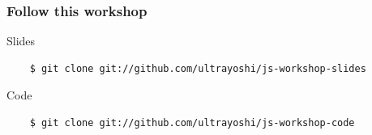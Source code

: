 \begin{frame}[fragile]
  \frametitle{Follow this workshop}

  \begin{block}{Slides}
    {\scriptsize
    \begin{verbatim}
    $ git clone git://github.com/ultrayoshi/js-workshop-slides
    \end{verbatim}
    }
  \end{block}

  \begin{block}{Code}
    {\scriptsize
    \begin{verbatim}
    $ git clone git://github.com/ultrayoshi/js-workshop-code
    \end{verbatim}
    }
  \end{block}
\end{frame}
